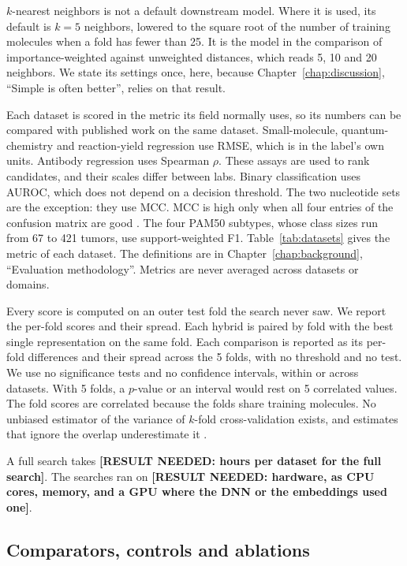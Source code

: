 $k$-nearest neighbors is not a default downstream model. Where it is used, its default is $k = 5$ neighbors, lowered to the square root of the number of training molecules when a fold has fewer than 25. It is the model in the comparison of importance-weighted against unweighted distances, which reads 5, 10 and 20 neighbors. We state its settings once, here, because Chapter~\ref{chap:discussion}, ``Simple is often better'', relies on that result.

Each dataset is scored in the metric its field normally uses, so its numbers can be compared with published work on the same dataset. Small-molecule, quantum-chemistry and reaction-yield regression use RMSE, which is in the label's own units. Antibody regression uses Spearman $\rho$. These assays are used to rank candidates, and their scales differ between labs. Binary classification uses AUROC, which does not depend on a decision threshold. The two nucleotide sets are the exception: they use MCC. MCC is high only when all four entries of the confusion matrix are good \citep{Chicco2020}. The four PAM50 subtypes, whose class sizes run from 67 to 421 tumors, use support-weighted F1. Table~\ref{tab:datasets} gives the metric of each dataset. The definitions are in Chapter~\ref{chap:background}, ``Evaluation methodology''. Metrics are never averaged across datasets or domains.

Every score is computed on an outer test fold the search never saw. We report the per-fold scores and their spread. Each hybrid is paired by fold with the best single representation on the same fold. Each comparison is reported as its per-fold differences and their spread across the 5 folds, with no threshold and no test. We use no significance tests and no confidence intervals, within or across datasets. With 5 folds, a $p$-value or an interval would rest on 5 correlated values. The fold scores are correlated because the folds share training molecules. No unbiased estimator of the variance of $k$-fold cross-validation exists, and estimates that ignore the overlap underestimate it \citep{Bengio2004}.

A full search takes \textbf{[RESULT NEEDED: hours per dataset for the full search]}. The searches ran on \textbf{[RESULT NEEDED: hardware, as CPU cores, memory, and a GPU where the DNN or the embeddings used one]}.


\subsection{Comparators, controls and ablations}

